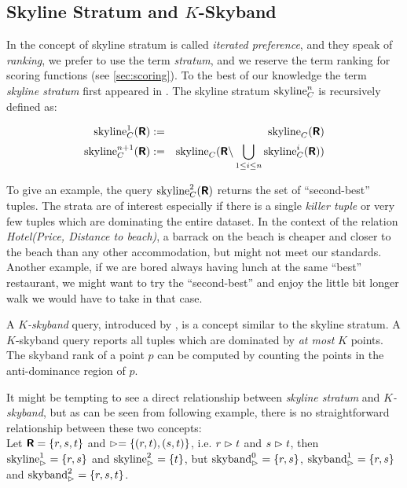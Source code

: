 \subsection{Skyline Stratum and $K$-Skyband}
\label{sec:skyline-stratum}
In \citep{Chomicki2003a} the concept of skyline stratum is called
\emph{iterated preference}, and they speak of 
\emph{ranking}, we prefer to use the term
\emph{stratum}, and we reserve the term ranking for
scoring functions (see \autoref{sec:scoring}).
To the best of our knowledge the term \emph{skyline stratum} first 
appeared in \citep{Chan2005}.
The  skyline stratum $\skyline_C^n$ is recursively defined as:

\begin{eqnarray}
\skyline_C^1(\relation{R}) & := & \skyline_C(\relation{R}) \\
\skyline_C^{n+1}(\relation{R}) & := & \skyline_C(\relation{R} \difference \bigunion_{1 \le i \le n} \skyline_C^i(\relation{R}))
\end{eqnarray}

To give an example, the query $\skyline_C^2(\relation{R})$ returns
the set of ``second-best'' tuples.
%
The strata are of interest especially if there is a single
\emph{killer tuple} or very few tuples which are dominating the entire
dataset.  In the context of the relation \emph{Hotel(Price, Distance
to beach)}, a barrack on the beach is cheaper and closer to the beach
than any other accommodation, but might not meet our
standards.  Another example, if we are bored always having lunch at the
same ``best'' restaurant, we might want to try the ``second-best'' and
enjoy the little bit longer walk we would have to take in that case.

A \emph{$K$-skyband} query, introduced by
\citet{Papadias2005}, is a concept similar to the skyline stratum. A
$K$-skyband query reports all tuples which are dominated by \emph{at most}
$K$ points.  
The skyband rank of a point $p$ can be computed by counting the points
in the anti-dominance region of $p$.

It might be tempting to see a direct relationship between
\emph{skyline stratum} and \emph{$K$-skyband}, but as can be seen from
following example, there is no straightforward relationship between these two
concepts: \\
Let $\textnormal{\bf\textsf{R}} = \{r, s, t\}$ and $\vartriangleright =\{(r,t), (s,t)\}$, 
i.e. $r \vartriangleright t$ and $s \vartriangleright t$, 
then $\skyline_\dominates^1 = \{r, s\}$ and $\skyline_\dominates^2 = \{t\}$, 
but $\skyband_\dominates^0 = \{r, s\}$, $\skyband_\dominates^1 = \{r, s\}$ and
$\skyband_\dominates^2 = \{r, s, t\}$.


